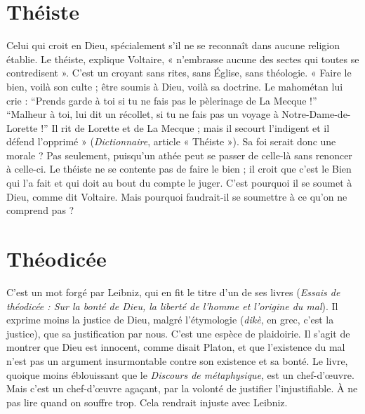 \section{Théiste}
Celui qui croit en Dieu, spécialement s’il ne se reconnaît dans
aucune religion établie. Le théiste, explique Voltaire, « n’embrasse
aucune des sectes qui toutes se contredisent ». C’est un croyant sans rites, sans
Église, sans théologie. « Faire le bien, voilà son culte ; être soumis à Dieu, voilà
sa doctrine. Le mahométan lui crie : “Prends garde à toi si tu ne fais pas le pèlerinage
de La Mecque !” “Malheur à toi, lui dit un récollet, si tu ne fais pas un
voyage à Notre-Dame-de-Lorette !” Il rit de Lorette et de La Mecque ; mais il
secourt l’indigent et il défend l'opprimé » ({\it Dictionnaire}, article « Théiste »).
Sa foi serait donc une morale ? Pas seulement, puisqu’un athée peut se passer
de celle-là sans renoncer à celle-ci. Le théiste ne se contente pas de faire le bien ;
il croit que c’est le Bien qui l’a fait et qui doit au bout du compte le juger. C’est
pourquoi il se soumet à Dieu, comme dit Voltaire. Mais pourquoi faudrait-il se
soumettre à ce qu’on ne comprend pas ?

\section{Théodicée}
C’est un mot forgé par Leibniz, qui en fit le titre d’un de ses
livres ({\it Essais de théodicée : Sur la bonté de Dieu, la liberté de
l’homme et l'origine du mal}). Il exprime moins la justice de Dieu, malgré l’étymologie
({\it dikè}, en grec, c’est la justice), que sa justification par nous. C’est une
espèce de plaidoirie. Il s’agit de montrer que Dieu est innocent, comme disait
Platon, et que l'existence du mal n’est pas un argument insurmontable contre
son existence et sa bonté. Le livre, quoique moins éblouissant que le {\it Discours de
métaphysique}, est un chef-d'œuvre. Mais c’est un chef-d'œuvre agaçant, par la
volonté de justifier l’injustifiable. À ne pas lire quand on souffre trop. Cela rendrait
injuste avec Leibniz.

